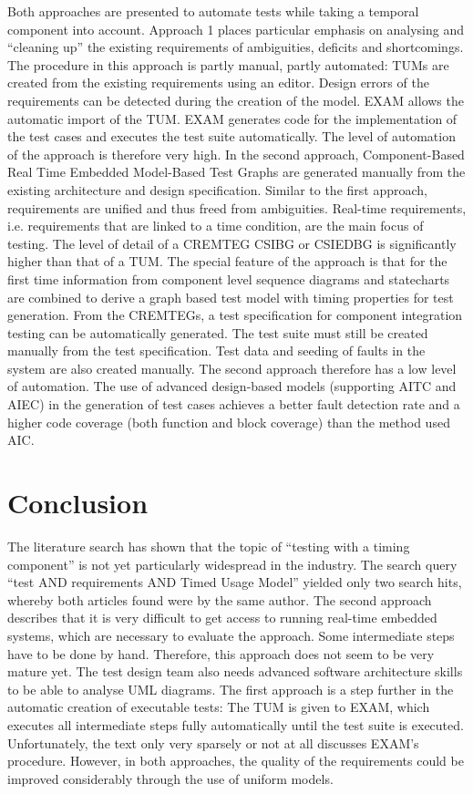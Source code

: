 Both approaches are presented to automate tests while taking a temporal
component into account. Approach 1 places particular emphasis on analysing
and \enquote{cleaning up} the existing requirements
of ambiguities, deficits and shortcomings. The procedure in this approach
is partly manual, partly automated: TUMs are created from the existing
requirements using an editor. Design errors of the requirements can
be detected during the creation of the model. EXAM allows the automatic
import of the TUM. EXAM generates code for the implementation of the
test cases and executes the test suite automatically. The level of
automation of the approach is therefore very high. In the second approach,
Component-Based Real Time Embedded Model-Based Test Graphs are generated
manually from the existing architecture and design specification.
Similar to the first approach, requirements are unified and thus freed
from ambiguities. Real-time requirements, i.e. requirements that are
linked to a time condition, are the main focus of testing. The level
of detail of a CREMTEG CSIBG or CSIEDBG is significantly higher than
that of a TUM. The special feature of the approach is that for the
first time information from component level sequence diagrams and
statecharts are combined to derive a graph based test model with timing
properties for test generation. From the CREMTEGs, a test specification
for component integration testing can be automatically generated.
The test suite must still be created manually from the test specification.
Test data and seeding of faults in the system are also created manually.
The second approach therefore has a low level of automation. The use
of advanced design-based models (supporting AITC and AIEC) in the
generation of test cases achieves a better fault detection rate and
a higher code coverage (both function and block coverage) than the
method used AIC.

\section{Conclusion\label{sec:topic_4_Conclusion}}

The literature search has shown that the topic of \enquote{testing
with a timing component} is not yet particularly widespread
in the industry. The search query \enquote{test AND requirements
AND Timed Usage Model} yielded only two
search hits, whereby both articles found were by the same author.
The second approach describes that it is very difficult to get access
to running real-time embedded systems, which are necessary to evaluate
the approach. Some intermediate steps have to be done by hand. Therefore,
this approach does not seem to be very mature yet. The test design
team also needs advanced software architecture skills to be able to
analyse UML diagrams. The first approach is a step further in the
automatic creation of executable tests: The TUM is given to EXAM,
which executes all intermediate steps fully automatically until the
test suite is executed. Unfortunately, the text only very sparsely
or not at all discusses EXAM's procedure. However, in both approaches,
the quality of the requirements could be improved considerably through
the use of uniform models.\\
\nocite{*}
